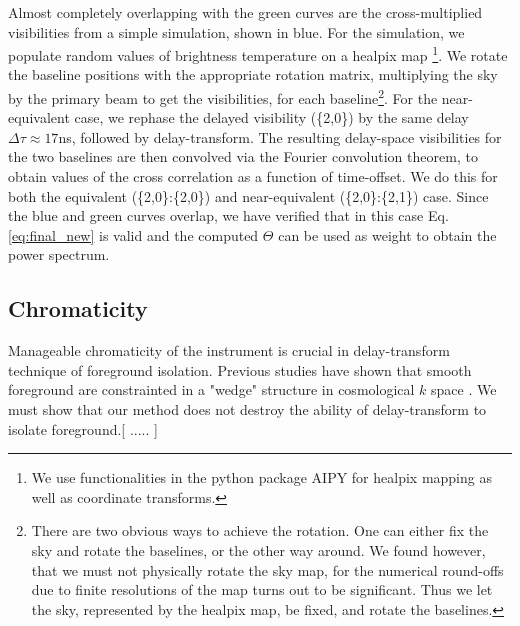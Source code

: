 \documentclass[twocolumn,apj,numberedappendix]{emulateapj}
\renewcommand\[{\begin{equation}}
\renewcommand\]{\end{equation}}
\begin{document}
Almost completely overlapping with the green curves are the cross-multiplied visibilities from a simple simulation, shown in blue. For the simulation, we populate random values of brightness temperature
on a healpix map \citep{Heal, HealPrimer} \footnote{We use functionalities in the python package AIPY for healpix mapping
as well as coordinate transforms. }. We rotate the baseline positions with
the appropriate rotation matrix, multiplying the sky by the primary beam to get the visibilities, for each
baseline\footnote{There are two obvious ways to achieve the rotation. One
can either fix the sky and rotate the baselines, or the other way
around. We found however, that we must not physically rotate the sky
map, for the numerical round-offs due to finite resolutions of the
map turns out to be significant. Thus we let the sky, represented
by the healpix map, be fixed, and rotate the baselines. }. For the near-equivalent case, we rephase the delayed visibility (\{2,0\}) by the same delay $\Delta\tau\approx17$ns, followed by delay-transform. The resulting delay-space visibilities for the two baselines are then convolved
via the Fourier convolution theorem, to obtain values of the cross
correlation as a function of time-offset.   We do this for both the equivalent (\{2,0\}:\{2,0\}) and near-equivalent (\{2,0\}:\{2,1\}) case.
Since the blue and green curves overlap, we have verified that in this case Eq.\ref{eq:final_new} is valid and the computed $\Theta$ can be used as weight to obtain the power spectrum. 


\subsection{Chromaticity \label{sec:chromaticity}}
Manageable chromaticity of the instrument is crucial in delay-transform technique of foreground isolation. Previous studies have shown that smooth foreground are constrainted in a "wedge" structure in cosmological $k$ space \citep{wedge1, wedge2}. We must show that our method does not destroy the ability of delay-transform to isolate foreground.[ ..... ]
\end{document}
